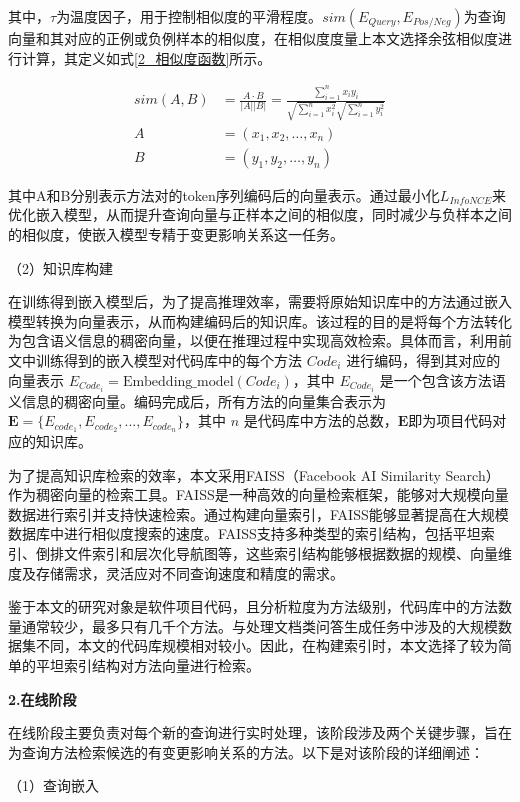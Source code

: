 其中，$\tau$为温度因子，用于控制相似度的平滑程度。$sim(E_{Query}, E_{Pos/Neg})$为查询向量和其对应的正例或负例样本的相似度，在相似度度量上本文选择余弦相似度进行计算，其定义如式\ref{2_相似度函数}所示。

\begin{align}
sim(A,B)&=\frac{A\cdot B}{\vert A\vert\vert B\vert}=\frac{\sum_{i = 1}^{n}x_iy_i}{\sqrt{\sum_{i = 1}^{n}x_i^2}\sqrt{\sum_{i = 1}^{n}y_i^2}} \\
A &= (x_1, x_2, \dots, x_n) \\
B &= (y_1, y_2, \dots, y_n)
\label{2_相似度函数}
\end{align}

其中A和B分别表示方法对的token序列编码后的向量表示。通过最小化$L_{InfoNCE}$来优化嵌入模型，从而提升查询向量与正样本之间的相似度，同时减少与负样本之间的相似度，使嵌入模型专精于变更影响关系这一任务。

（2）知识库构建

在训练得到嵌入模型后，为了提高推理效率，需要将原始知识库中的方法通过嵌入模型转换为向量表示，从而构建编码后的知识库。该过程的目的是将每个方法转化为包含语义信息的稠密向量，以便在推理过程中实现高效检索。具体而言，利用前文中训练得到的嵌入模型对代码库中的每个方法 $Code_i$ 进行编码，得到其对应的向量表示 $E_{Code_i} = \text{Embedding\_model}(Code_i)$，其中 $E_{Code_i}$ 是一个包含该方法语义信息的稠密向量。编码完成后，所有方法的向量集合表示为 $\mathbf{E} = \{ E_{code_1}, E_{code_2}, ..., E_{code_n} \}$，其中 $n$ 是代码库中方法的总数，$\mathbf{E}$即为项目代码对应的知识库。


为了提高知识库检索的效率，本文采用FAISS（Facebook AI Similarity Search）作为稠密向量的检索工具。FAISS是一种高效的向量检索框架，能够对大规模向量数据进行索引并支持快速检索。通过构建向量索引，FAISS能够显著提高在大规模数据库中进行相似度搜索的速度。FAISS支持多种类型的索引结构，包括平坦索引、倒排文件索引和层次化导航图等，这些索引结构能够根据数据的规模、向量维度及存储需求，灵活应对不同查询速度和精度的需求。

鉴于本文的研究对象是软件项目代码，且分析粒度为方法级别，代码库中的方法数量通常较少，最多只有几千个方法。与处理文档类问答生成任务中涉及的大规模数据集不同，本文的代码库规模相对较小。因此，在构建索引时，本文选择了较为简单的平坦索引结构对方法向量进行检索。

\noindent \textbf{2.在线阶段}

在线阶段主要负责对每个新的查询进行实时处理，该阶段涉及两个关键步骤，旨在为查询方法检索候选的有变更影响关系的方法。以下是对该阶段的详细阐述：


（1）查询嵌入

